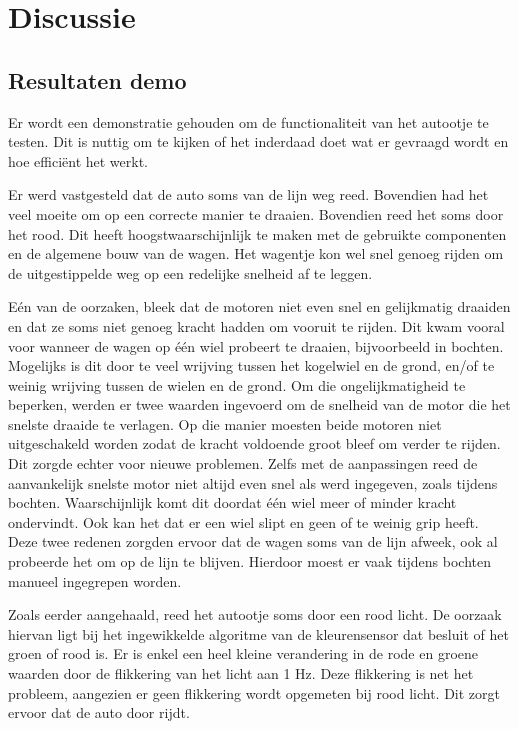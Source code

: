 \documentclass[a4paper,twoside,kulak]{kulakreport} %
\begin{document}
\section{Discussie} %
\subsection{Resultaten demo}  %
Er wordt een demonstratie gehouden om de functionaliteit van het autootje te testen. Dit is nuttig om te kijken of het inderdaad doet wat er gevraagd wordt en hoe efficiënt het werkt.

Er werd vastgesteld dat de auto soms van de lijn weg reed. Bovendien had het veel moeite om op een correcte manier te draaien. Bovendien reed het soms door het rood. Dit heeft hoogstwaarschijnlijk te maken met de gebruikte componenten en de algemene bouw van de wagen. Het wagentje kon wel snel genoeg rijden om de uitgestippelde weg op een redelijke snelheid af te leggen.

Eén van de oorzaken, bleek dat de motoren niet even snel en gelijkmatig draaiden en dat ze soms niet genoeg kracht hadden om vooruit te rijden. Dit kwam vooral voor wanneer de wagen op één wiel probeert te draaien, bijvoorbeeld in bochten. Mogelijks is dit door te veel wrijving tussen het kogelwiel en de grond, en/of te weinig wrijving tussen de wielen en de grond. Om die ongelijkmatigheid te beperken, werden er twee waarden ingevoerd om de snelheid van de motor die het snelste draaide te verlagen. Op die manier moesten beide motoren niet uitgeschakeld worden zodat de kracht voldoende groot bleef om verder te rijden. Dit zorgde echter voor nieuwe problemen. Zelfs met de aanpassingen reed de aanvankelijk snelste motor niet altijd even snel als werd ingegeven, zoals tijdens bochten. Waarschijnlijk komt dit doordat één wiel meer of minder kracht ondervindt. Ook kan het dat er een wiel slipt en geen of te weinig grip heeft. Deze twee redenen zorgden ervoor dat de wagen soms van de lijn afweek, ook al probeerde het om op de lijn te blijven. Hierdoor moest er vaak tijdens bochten manueel ingegrepen worden.

Zoals eerder aangehaald, reed het autootje soms door een rood licht. De oorzaak hiervan ligt bij het ingewikkelde algoritme van de kleurensensor dat besluit of het groen of rood is. Er is enkel een heel kleine verandering in de rode en groene waarden door de flikkering van het licht aan 1 Hz. Deze flikkering is net het probleem, aangezien er geen flikkering wordt opgemeten bij rood licht. Dit zorgt ervoor dat de auto door rijdt.
\end{document}
